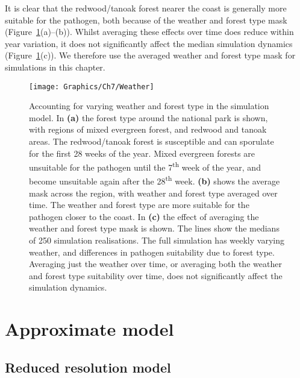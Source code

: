 It is clear that the redwood/tanoak forest nearer the coast is generally more suitable for the pathogen, both because of the weather and forest type mask (Figure~\ref{fig:ch7:weather}(a)--(b)). Whilst averaging these effects over time does reduce within year variation, it does not significantly affect the median simulation dynamics (Figure~\ref{fig:ch7:weather}(c)). We therefore use the averaged weather and forest type mask for simulations in this chapter.

\begin{figure}
    \begin{center}
        \texttt{[image: Graphics/Ch7/Weather]}
        \caption[Acounting for weather and forest type in the simulation model]{Accounting for varying weather and forest type in the simulation model. In \textbf{(a)} the forest type around the national park is shown, with regions of mixed evergreen forest, and redwood and tanoak areas. The redwood/tanoak forest is susceptible and can sporulate for the first 28 weeks of the year. Mixed evergreen forests are unsuitable for the pathogen until the 7\textsuperscript{th} week of the year, and become unsuitable again after the 28\textsuperscript{th} week. \textbf{(b)} shows the average mask across the region, with weather and forest type averaged over time. The weather and forest type are more suitable for the pathogen closer to the coast. In \textbf{(c)} the effect of averaging the weather and forest type mask is shown. The lines show the medians of 250 simulation realisations. The full simulation has weekly varying weather, and differences in pathogen suitability due to forest type. Averaging just the weather over time, or averaging both the weather and forest type suitability over time, does not significantly affect the simulation dynamics.\label{fig:ch7:weather}}
    \end{center}
\end{figure}

\section{Approximate model}

\subsection{Reduced resolution model}

